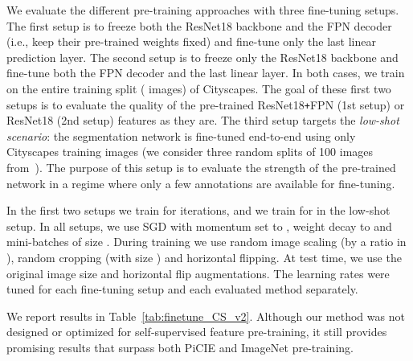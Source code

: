 \documentclass[runningheads]{llncs}
\def\Plus{\texttt{+}}
\begin{document}
We evaluate the different pre-training approaches with three 
fine-tuning setups.
The first setup is to freeze both the ResNet18 backbone and the FPN decoder (i.e., keep their pre-trained weights fixed) and fine-tune only the last linear prediction layer.
The second setup is to freeze only the ResNet18 backbone and fine-tune both the FPN decoder and the last linear layer.
In both cases, we train on the entire training split ( images) of Cityscapes.
The goal of these first two setups is to evaluate the quality of the pre-trained ResNet18\Plus FPN (1st setup) or ResNet18 (2nd setup) features as they are.
The third setup targets the \emph{low-shot scenario}: the segmentation network is  fine-tuned end-to-end using only  Cityscapes training images (we consider three random splits of 100 images from~\cite{french2020semi}).
The purpose of this setup is to evaluate the strength of the pre-trained network in a regime where only a few annotations are available for fine-tuning. 

In the first two setups we train for 
 iterations, and we train for  in the low-shot setup.
In all setups, we use SGD with momentum set to , weight decay to  and mini-batches of size .
During training we use random image scaling (by a ratio in ), random cropping (with size ) and horizontal flipping. At test time, we use the original image size and horizontal flip augmentations.
The learning rates were tuned for each fine-tuning setup and each evaluated method separately. 

We report results in Table~\ref{tab:finetune_CS_v2}.
Although our method was not designed or optimized for self-supervised feature pre-training, it still provides promising results that surpass both PiCIE and ImageNet pre-training. 
\end{document}

